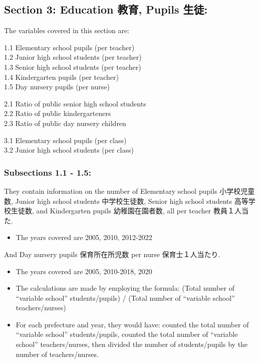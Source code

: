 \documentclass[
  12pt,
  letterpaper,
  DIV=11,
  numbers=noendperiod]{scrartcl}
\providecommand{\tightlist}{%
  \setlength{\itemsep}{0pt}\setlength{\parskip}{0pt}}\usepackage{longtable,booktabs,array}
\begin{document}
\hypertarget{section-3-education-ux6559ux80b2-pupils-ux751fux5f92}{%
\subsection{Section 3: Education 教育, Pupils
生徒:}\label{section-3-education-ux6559ux80b2-pupils-ux751fux5f92}}

The variables covered in this section are:

1.1 Elementary school pupils (per teacher)\\
1.2 Junior high school students (per teacher)\\
1.3 Senior high school students (per teacher)\\
1.4 Kindergarten pupils (per teacher)\\
1.5 Day nursery pupils (per nurse)

2.1 Ratio of public senior high school students\\
2.2 Ratio of public kindergarteners\\
2.3 Ratio of public day nursery children

3.1 Elementary school pupils (per class)\\
3.2 Junior high school students (per class)

\hypertarget{subsections-1.1---1.5}{%
\subsubsection{Subsections 1.1 - 1.5:}\label{subsections-1.1---1.5}}

They contain information on the number of Elementary school pupils
小学校児童数, Junior high school students 中学校生徒数, Senior high
school students 高等学校生徒数, and Kindergarten pupils 幼稚園在園者数,
all per teacher 教員１人当た.

\begin{itemize}
\tightlist
\item
  The years covered are 2005, 2010, 2012-2022
\end{itemize}

And Day nursery pupils 保育所在所児数 per nurse 保育士１人当たり.

\begin{itemize}
\item
  The years covered are 2005, 2010-2018, 2020
\item
  The calculations are made by employing the formula: (Total number of
  ``variable school'' students/pupils) / (Total number of ``variable
  school'' teachers/nurses)
\item
  For each prefecture and year, they would have: counted the total
  number of ``variable school'' students/pupils, counted the total
  number of ``variable school'' teachers/nurses, then divided the number
  of students/pupils by the number of teachers/nurses.
\end{itemize}
\end{document}
